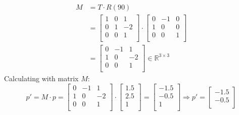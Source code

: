 \documentclass{article}
\begin{document}
\begin{equation*}
    \begin{aligned}
        M & = T \cdot R(90) \\[-0.2ex]
          & =
        \begin{bmatrix}
            1 & 0 & 1  \\
            0 & 1 & -2 \\
            0 & 0 & 1  \\
        \end{bmatrix}
        \cdot
        \begin{bmatrix}
            0 & -1 & 0 \\
            1 & 0  & 0 \\
            0 & 0  & 1 \\
        \end{bmatrix}      \\[-0.2ex]
          & =
        \begin{bmatrix}
            0 & -1 & 1  \\
            1 & 0  & -2 \\
            0 & 0  & 1  \\
        \end{bmatrix}
        \in \mathbb{R}^{3 \times 3}
    \end{aligned}
\end{equation*}
Calculating with matrix $M$:
\[
    p' = M \cdot p =
    \begin{bmatrix}
        0 & -1 & 1  \\
        1 & 0  & -2 \\
        0 & 0  & 1  \\
    \end{bmatrix}
    \cdot
    \begin{bmatrix}
        1.5 \\
        2.5 \\
        1   \\
    \end{bmatrix}
    =
    \begin{bmatrix}
        -1.5 \\
        -0.5 \\
        1    \\
    \end{bmatrix}
    \Rightarrow
    p' =
    \begin{bmatrix}
        -1.5 \\
        -0.5 \\
    \end{bmatrix}
\]
\end{document}

